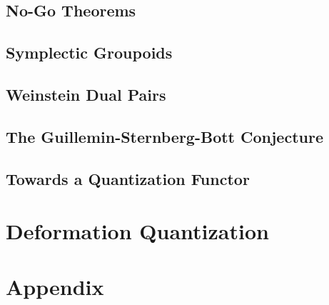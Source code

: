 \documentclass{amsbook}
\begin{document}
\chapter{No-Go Theorems}

\chapter{Symplectic Groupoids}


\chapter{Weinstein Dual Pairs}

\chapter{The Guillemin-Sternberg-Bott Conjecture}

\chapter{Towards a Quantization Functor}






\part{Deformation Quantization}
\part{Appendix}
\end{document}
